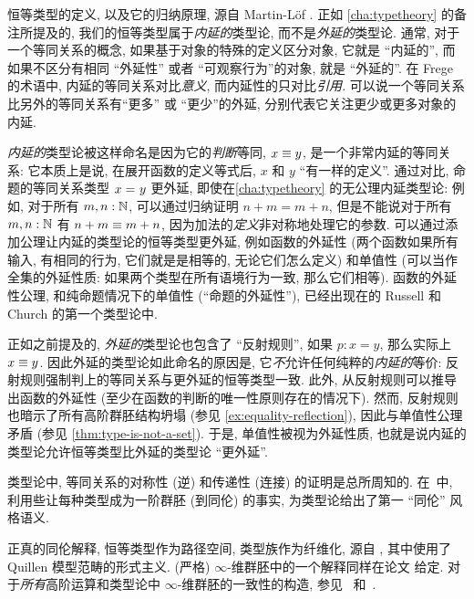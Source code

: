 \sectionNotes

恒等类型的定义, 以及它的归纳原理, 源自 Martin-L\"of \cite{Martin-Lof-1972}.
%
%
%
%
正如 \cref{cha:typetheory} 的备注所提及的, 我们的恒等类型属于\emph{内延的}类型论, 而不是\emph{外延的}类型论.
通常, 对于一个等同关系的概念, 如果基于对象的特殊的定义区分对象, 它就是 ``内延的'', 而如果不区分有相同 ``外延性'' 或者 ``可观察行为''的对象, 就是 ``外延的''.
在 Frege 的术语中, 内延的等同关系对比\emph{意义}, 而内延性的只对比\emph{引用}.
可以说一个等同关系比另外的等同关系有``更多'' 或 ``更少''的外延, 分别代表它关注更少或更多对象的内延.

\emph{内延的}类型论被这样命名是因为它的\emph{判断}等同, $x\equiv y$, 是一个非常内延的等同关系: 它本质上是说, 在展开函数的定义等式后, $x$ 和 $y$ ``有一样的定义''.
通过对比, 命题的等同关系类型 $x =_{} y$ 更外延, 即使在\cref{cha:typetheory} 的无公理内延类型论: 例如, 对于所有 $m,n:\mathbb{N}$, 可以通过归纳证明 $n+m=m+n$, 但是不能说对于所有 $m,n:\mathbb{N}$ 有 $n+m\equiv m+n$, 因为加法的\emph{定义}非对称地处理它的参数.
可以通过添加公理让内延的类型论的恒等类型更外延, 例如函数的外延性 (两个函数如果所有输入, 有相同的行为, 它们就是是相等的, 无论它们怎么定义) 和单值性 (可以当作全集的外延性质: 如果两个类型在所有语境行为一致, 那么它们相等).
函数的外延性公理, 和纯命题情况下的单值性 (``命题的外延性''), 已经出现在的 Russell 和 Church 的第一个类型论中.

正如之前提及的, \emph{外延的}类型论也包含了 ``反射规则'', 如果 $p:x=y$, 那么实际上 $x\equiv y$.
因此外延的类型论如此命名的原因是, 它\emph{不}允许任何纯粹的\emph{内延的}等价: 反射规则强制判上的等同关系与更外延的恒等类型一致.
此外, 从反射规则可以推导出函数的外延性 (至少在函数的判断的唯一性原则存在的情况下).
然而, 反射规则也暗示了所有高阶群胚结构坍塌 (参见 \cref{ex:equality-reflection}), 因此与单值性公理矛盾 (参见 \cref{thm:type-is-not-a-set}).
于是, 单值性被视为外延性质, 也就是说内延的类型论允许恒等类型比外延的类型论 ``更外延''.

类型论中, 等同关系的对称性 (逆) 和传递性 (连接) 的证明是总所周知的.
在~\cite{hs:gpd-typethy}中, 利用些让每种类型成为一阶群胚 (到同伦) 的事实, 为类型论给出了第一 ``同伦'' 风格语义.

正真的同伦解释, 恒等类型作为路径空间, 类型族作为纤维化, 源自 \cite{AW}, 其中使用了 Quillen 模型范畴的形式主义.
(严格) $\infty$-维群胚中的一个解释同样在论文 \cite{mw:thesis} 给定.
对于\emph{所有}高阶运算和类型论中 $\infty$-维群胚的一致性的构造, 参见~\cite{pll:wkom-type} 和~\cite{bg:type-wkom}.

